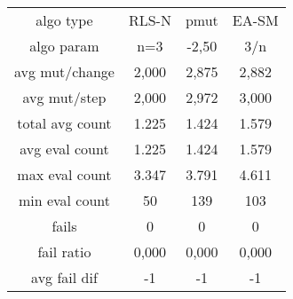\begin{tabular}[h]{cccc}
algo type&            RLS-N&      pmut&     EA-SM\\
algo param&             n=3&     -2,50&       3/n\\
avg mut/change&       2,000&     2,875&     2,882\\
avg mut/step&         2,000&     2,972&     3,000\\
\hline
total avg count&      1.225&     1.424&     1.579\\
avg eval count&       1.225&     1.424&     1.579\\
max eval count&       3.347&     3.791&     4.611\\
min eval count&          50&       139&       103\\
\hline
fails&                    0&         0&         0\\
fail ratio&           0,000&     0,000&     0,000\\
avg fail dif&            -1&        -1&        -1\\
\end{tabular}

